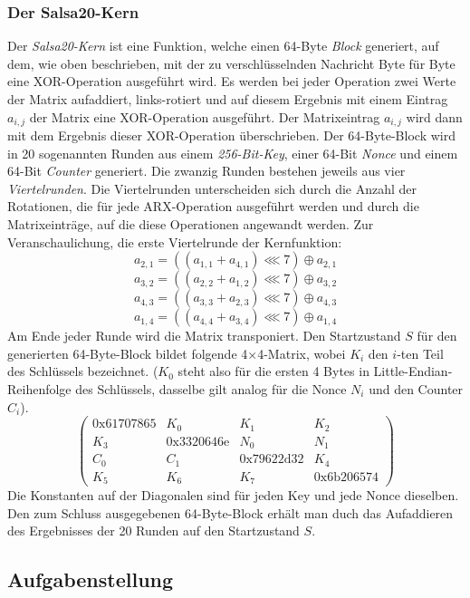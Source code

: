 \documentclass[course=erap]{aspdoc}
\begin{document}
\subsubsection{Der Salsa20-Kern} \label{salsa20-kern}
Der \emph{Salsa20-Kern} ist eine Funktion, welche einen 64-Byte \emph{Block} generiert, auf dem, wie oben beschrieben, mit 
der zu verschlüsselnden Nachricht Byte für Byte eine XOR-Operation ausgeführt wird. Es werden bei jeder Operation 
zwei Werte der Matrix aufaddiert, links-rotiert und auf diesem Ergebnis mit einem Eintrag $a_{i,j}$ der Matrix eine XOR-Operation ausgeführt.
Der Matrixeintrag $a_{i,j}$ wird dann mit dem Ergebnis dieser XOR-Operation überschrieben.
Der 64-Byte-Block wird in 20 sogenannten Runden aus einem \emph{256-Bit-Key}, einer 64-Bit \emph{Nonce} und einem 64-Bit 
\emph{Counter} generiert. Die zwanzig Runden bestehen jeweils aus vier \emph{Viertelrunden}. Die Viertelrunden unterscheiden sich 
durch die Anzahl der Rotationen, die für jede ARX-Operation ausgeführt werden und durch die Matrixeinträge, auf die 
diese Operationen angewandt werden. 
Zur Veranschaulichung, die erste Viertelrunde der Kernfunktion:
\[a_{2,1} = ((a_{1,1} + a_{4,1}) \lll 7) \oplus a_{2,1}\]
\[a_{3,2} = ((a_{2,2} + a_{1,2}) \lll 7) \oplus a_{3,2}\] 
\[a_{4,3} = ((a_{3,3} + a_{2,3}) \lll 7) \oplus a_{4,3}\] 
\[a_{1,4} = ((a_{4,4} + a_{3,4}) \lll 7) \oplus a_{1,4}\]
Am Ende jeder Runde wird die Matrix transponiert.
Den Startzustand $S$ für den generierten 64-Byte-Block bildet folgende 4$\times$4-Matrix, wobei $K_i$ den $i$-ten Teil
des Schlüssels bezeichnet. ($K_0$ steht also für die ersten 4 Bytes in Little-Endian-Reihenfolge des Schlüssels, dasselbe gilt analog für die
Nonce $N_i$ und den Counter $C_i$).
\[
    \begin{pmatrix}
    0\text{x}61707865 & K_0 & K_1 & K_2\\
    K_3 & 0\text{x}3320646\text{e} & N_0 & N_1\\
    C_0 & C_1 & 0\text{x}79622\text{d}32 & K_4\\
    K_5 & K_6 & K_7 & 0\text{x}6\text{b}206574
    \end{pmatrix}
\]
Die Konstanten auf der Diagonalen sind für jeden Key und jede Nonce dieselben.
Den zum Schluss ausgegebenen 64-Byte-Block erhält man duch das Aufaddieren des 
Ergebnisses der 20 Runden auf den Startzustand $S$.

\subsection{Aufgabenstellung}
\end{document}
